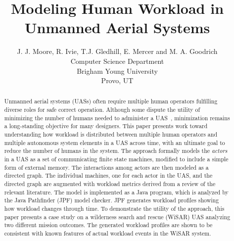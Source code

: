 \documentclass[letterpaper]{article}
\begin{document}
%
\title{Modeling Human Workload in Unmanned Aerial Systems}
\author{J. J. Moore, R. Ivie, T.J. Gledhill, E. Mercer and M. A. Goodrich\\
Computer Science Department \\ Brigham Young University \\ Provo, UT\\
}
\maketitle
\begin{abstract}
Unmanned aerial systems (UASs) often require multiple human operators fulfilling diverse roles for safe correct operation.  Although some dispute the utility of minimizing the number of humans needed to administer a UAS~\cite{MurphyBurke2010}, minimization remains a long-standing objective for many designers.  This paper presents work toward understanding how workload is distributed between multiple human operators and multiple autonomous system elements in a UAS across time, with an ultimate goal to reduce the number of humans in the system. The approach formally models the {\em actors} in a UAS as a set of communicating finite state machines, modified to include a simple form of external memory. The interactions among actors are then modeled as a directed graph.  The individual machines, one for each actor in the UAS, and the directed graph are augmented with workload metrics derived from a review of the relevant literature. The model is implemented as a Java program, which is analyzed by the Java Pathfinder (JPF) model checker. JPF generates workload profiles showing how workload changes through time.  To demonstrate the utility of the approach, this paper presents a case study on a wilderness search and rescue (WiSAR) UAS analyzing two different mission outcomes. The generated workload profiles are shown to be consistent with known features of actual workload events in the WiSAR system. 
\end{abstract}

\noindent 









\end{document}
